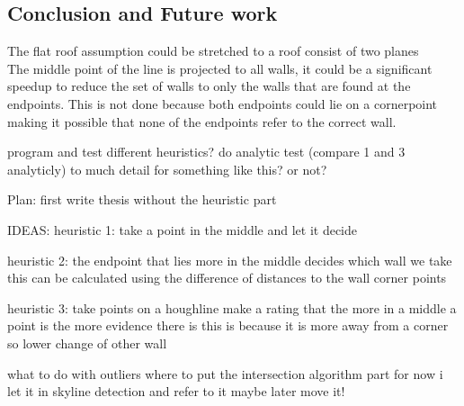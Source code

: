 \subsection{Conclusion and Future work}
The flat roof assumption could be stretched to a roof consist of two planes
\\
The middle point of the line is projected to all walls, it could be a significant speedup to reduce the set of walls to only the walls that are found at the endpoints. This is not done because both endpoints could lie on a cornerpoint making it possible that none of the endpoints refer to the correct wall.


program and test different heuristics?
do analytic test (compare 1 and 3 analyticly)
	to much detail for something like this? or not?

Plan:
first write thesis without the heuristic part

IDEAS:
heuristic 1:
take a point in the middle and let it decide

heuristic 2:
the endpoint that lies more in the middle decides which wall we take
this can be calculated using the difference of distances to the wall corner points

heuristic 3:
take points on a houghline
make a rating that the more in a middle a point is the more evidence there is
this is because it is more away from a corner so lower change of other wall


what to do with outliers
where to put the intersection algorithm part
for now i let it in skyline detection and refer to it
maybe later move it!



